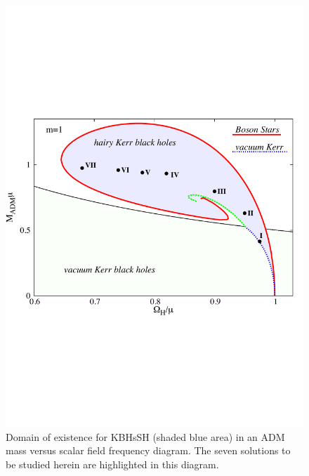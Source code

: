 \documentclass[twocolumn,aps,showpacs,showkeys,prd,superscriptaddress,byrevtex, amsmath]{revtex4-1}
\begin{document}
\begin{figure}
\centering
\includegraphics[scale=0.43]{figures/existence-new.pdf}
\caption{Domain of existence for KBHsSH (shaded blue area) in an ADM mass versus scalar
field frequency diagram. The seven solutions to be studied herein are highlighted in this diagram.}
\label{existence}
\end{figure}
\end{document}
